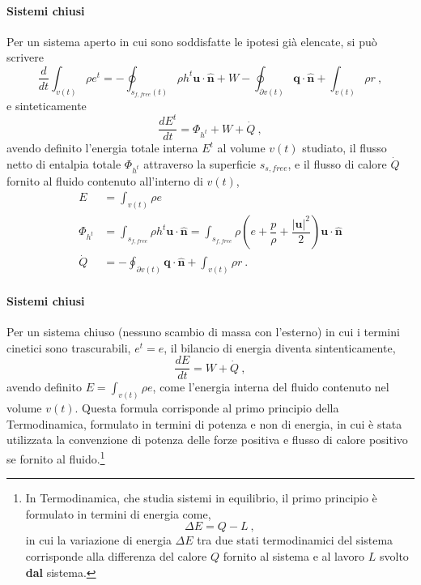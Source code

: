 \paragraph{Sistemi chiusi}
Per un sistema aperto in cui sono soddisfatte le ipotesi già elencate, si può scrivere
\begin{equation}
 \dfrac{d}{dt} \displaystyle\int_{v(t)} \rho e^t = - \oint_{s_{f,free}(t)} \rho h^t \bm{u} \cdot \bm{\hat{n}}
  + W - \oint_{\partial v(t)} \bm{q} \cdot \bm{\hat{n}} + \int_{v(t)} \rho r \ ,
\end{equation}
e sinteticamente
\begin{equation}
  \dfrac{d E^t}{d t} = \Phi_{h^t} + W + \dot{Q} \ ,
\end{equation}
avendo definito l'energia totale interna $E^t$ al volume $v(t)$ studiato, il flusso netto di entalpia totale $\Phi_{h^t}$ attraverso la superficie $s_{s,free}$, e il flusso di calore $\dot{Q}$ fornito al fluido contenuto all'interno di $v(t)$,
\begin{equation}
\begin{aligned}
  E & = \int_{v(t)} \rho e \\
  \Phi_{h^t} & = \int_{s_{f,free}} \rho h^t \bm{u} \cdot \bm{\hat{n}}
               = \int_{s_{f,free}} \rho \left( e + \dfrac{p}{\rho} + \dfrac{|\bm{u}|^2}{2} \right) \bm{u} \cdot \bm{\hat{n}} \\
 \dot{Q} & = - \oint_{\partial v(t)} \bm{q} \cdot \bm{\hat{n}} + \int_{v(t)} \rho r \ . 
\end{aligned}
\end{equation}

\paragraph{Sistemi chiusi}
Per un sistema chiuso (nessuno scambio di massa con l'esterno) in cui i termini cinetici sono trascurabili, $e^t = e$, il bilancio di energia diventa sintenticamente,
\begin{equation}
 \dfrac{d E}{dt} = W + \dot{Q} \ ,
\end{equation}
avendo definito $E = \displaystyle\int_{v(t)} \rho e$, come l'energia interna del fluido contenuto nel volume $v(t)$.
Questa formula corrisponde al primo principio della Termodinamica, formulato in termini di potenza e non di energia, in cui è stata utilizzata la convenzione di potenza delle forze positiva e flusso di calore positivo se fornito al fluido.\footnote{In Termodinamica, che studia sistemi in equilibrio, il primo principio è formulato in termini di energia come,
\begin{equation}
 \Delta E = Q - L \ ,
\end{equation}
in cui la variazione di energia $\Delta E$ tra due stati termodinamici del sistema corrisponde alla differenza del calore $Q$ fornito al sistema e al lavoro $L$ svolto \textbf{dal} sistema.
}

